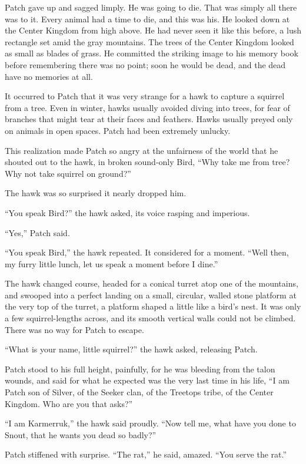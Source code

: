 \documentclass[ebook,oneside,openany,17pt]{memoir}
\begin{document}
Patch gave up and sagged limply. He was going to die. That was simply
all there was to it. Every animal had a time to die, and this was
his. He looked down at the Center Kingdom from high above. He had
never seen it like this before, a lush rectangle set amid the gray
mountains. The trees of the Center Kingdom looked as small as blades
of grass. He committed the striking image to his memory book before
remembering there was no point; soon he would be dead, and the dead
have no memories at all.

It occurred to Patch that it was very strange for a hawk to capture a
squirrel from a tree. Even in winter, hawks usually avoided diving
into trees, for fear of branches that might tear at their faces and
feathers. Hawks usually preyed only on animals in open spaces. Patch
had been extremely unlucky.

This realization made Patch so angry at the unfairness of the world
that he shouted out to the hawk, in broken sound-only Bird, “Why take
me from tree? Why not take squirrel on ground?”

The hawk was so surprised it nearly dropped him.

“You speak Bird?” the hawk asked, its voice rasping and imperious.

“Yes,” Patch said.

“You speak Bird,” the hawk repeated. It considered for a moment. “Well
then, my furry little lunch, let us speak a moment before I dine.”

The hawk changed course, headed for a conical turret atop one of the
mountains, and swooped into a perfect landing on a small, circular,
walled stone platform at the very top of the turret, a platform shaped
a little like a bird’s nest. It was only a few squirrel-lengths
across, and its smooth vertical walls could not be climbed. There was
no way for Patch to escape.

“What is your name, little squirrel?” the hawk asked, releasing Patch.

Patch stood to his full height, painfully, for he was bleeding from
the talon wounds, and said for what he expected was the very last time
in his life, “I am Patch son of Silver, of the Seeker clan, of the
Treetops tribe, of the Center Kingdom. Who are you that asks?”

“I am Karmerruk,” the hawk said proudly. “Now tell me, what have you
done to Snout, that he wants you dead so badly?”

Patch stiffened with surprise. “The rat,” he said, amazed. “You serve
the rat.”
\end{document}
